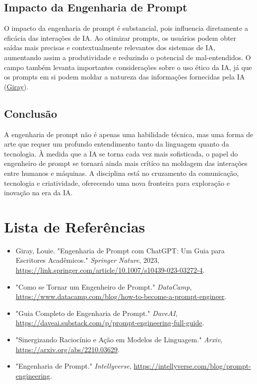 \documentclass[tcc,capa]{texufpel}
\begin{document}
\subsection*{Impacto da Engenharia de Prompt}

O impacto da engenharia de prompt é substancial, pois influencia diretamente a eficácia das interações de IA. Ao otimizar prompts, os usuários podem obter saídas mais precisas e contextualmente relevantes dos sistemas de IA, aumentando assim a produtividade e reduzindo o potencial de mal-entendidos. O campo também levanta importantes considerações sobre o uso ético da IA, já que os prompts em si podem moldar a natureza das informações fornecidas pela IA (\href{https://link.springer.com/content/pdf/10.1007/s10439-023-03272-4.pdf?pdf=button}{Giray}).

\subsection*{Conclusão}

A engenharia de prompt não é apenas uma habilidade técnica, mas uma forma de arte que requer um profundo entendimento tanto da linguagem quanto da tecnologia. À medida que a IA se torna cada vez mais sofisticada, o papel do engenheiro de prompt se tornará ainda mais crítico na moldagem das interações entre humanos e máquinas. A disciplina está no cruzamento da comunicação, tecnologia e criatividade, oferecendo uma nova fronteira para exploração e inovação na era da IA.

\section*{Lista de Referências}

\begin{itemize}
  \item Giray, Louie. "Engenharia de Prompt com ChatGPT: Um Guia para Escritores Acadêmicos." \textit{Springer Nature}, 2023, \url{https://link.springer.com/article/10.1007/s10439-023-03272-4}.
  \item "Como se Tornar um Engenheiro de Prompt." \textit{DataCamp}, \url{https://www.datacamp.com/blog/how-to-become-a-prompt-engineer}.
  \item "Guia Completo de Engenharia de Prompt." \textit{DaveAI}, \url{https://daveai.substack.com/p/prompt-engineering-full-guide}.
  \item "Sinergizando Raciocínio e Ação em Modelos de Linguagem." \textit{Arxiv}, \url{https://arxiv.org/abs/2210.03629}.
  \item "Engenharia de Prompt." \textit{Intellyverse}, \url{https://intellyverse.com/blog/prompt-engineering}.
\end{itemize}
\end{document}

